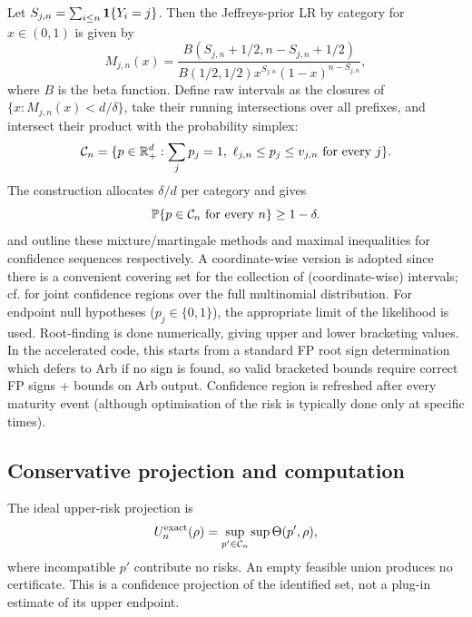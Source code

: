 Let $S_{j,n} = \sum_{i \leq n} \mathbf 1\{Y_i = j\}$. Then the Jeffreys-prior LR by category for $x \in (0,1)$ is given by
\begin{equation}\label{eq:mixture}
 M_{j,n}(x)=\frac{B(S_{j,n}+1/2,n-S_{j,n}+1/2)}
 {B(1/2,1/2)x^{S_{j,n}}(1-x)^{n-S_{j,n}}},
\end{equation}
where $B$ is the beta function. Define raw intervals as the closures of $\{x:M_{j,n}(x)<d/\delta\}$, take their running intersections over all prefixes, and intersect their product with the probability simplex:
\begin{equation}\label{eq:CS}
 \mathcal C_n=\{p\in\mathbb R_+^d:\sum_jp_j=1,
              \ \ell_{j,n}\le p_j\le v_{j,n}\text{ for every }j\}.
\end{equation}
The construction allocates $\delta/d$ per category and gives
\begin{equation}\label{eq:CSguarantee}
 \mathbb P\{p\in\mathcal C_n\text{ for every }n\}\ge1-\delta.
\end{equation}
\citet{howard2021} and \citet{ramdas2023} outline these mixture/martingale methods and maximal inequalities for confidence sequences respectively. A coordinate-wise version is adopted since there is a convenient covering set for the collection of (coordinate-wise) intervals; cf. \citep{lindon2022} for joint confidence regions over the full multinomial distribution. For endpoint null hypotheses ($p_j\in\{0,1\}$), the appropriate limit of the likelihood is used. Root-finding is done numerically, giving upper and lower bracketing values. In the accelerated code, this starts from a standard FP root sign determination which defers to Arb if no sign is found, so valid bracketed bounds require correct FP signs + bounds on Arb output. Confidence region is refreshed after every maturity event (although optimisation of the risk is typically done only at specific times).

\subsection{Conservative projection and computation}
The ideal upper-risk projection is
\begin{equation}\label{eq:idealprojection}
 U_n^{\rm exact}(\rho)=\sup_{p'\in\mathcal C_n}\sup\Theta(p',\rho),
\end{equation}
where incompatible $p'$ contribute no risks. An empty feasible union produces no certificate. This is a confidence projection of the identified set, not a plug-in estimate of its upper endpoint.

